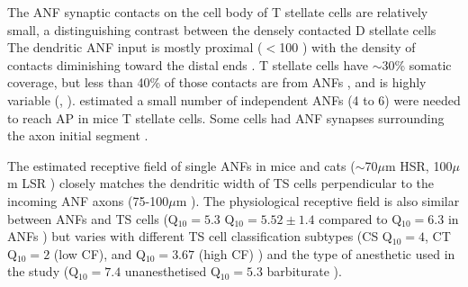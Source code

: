The ANF synaptic contacts on the cell body of T stellate cells are relatively small,
a distinguishing contrast between the densely contacted D stellate cells
\citep{Cant:1981,Cant:1982,RyugoWrightEtAl:1993,TolbertMorest:1982a,FayPopper:1994,ReddCahillEtAl:2002,RyugoWrigthEtAl:1993,Ryugo:1992,RyugoParks:2003}
The dendritic ANF input is mostly proximal ($<$100 \um) with the density of contacts
diminishing toward the distal ends \citep{SmithRhode:1989}.  T stellate cells have
$\sim$30\% somatic coverage, but less than 40\% of those contacts are from ANFs
\citep{Cant:1981,Cant:1982,RyugoWrightEtAl:1993,TolbertMorest:1982a,SmithRhode:1989},
and is highly variable (\citep*[36$\pm$10.5\% of somatic terminals in
cat][]{SmithRhode:1989}, \citep*[0--6 terminals per soma in
chinchilla][]{JosephsonMorest:1998}).  \citet{FerragamoGoldingEtAl:1998a} estimated a
small number of independent ANFs (4 to 6) were needed to reach AP in mice T stellate
cells.  Some cells had ANF synapses surrounding the axon initial segment
\citep{JosephsonMorest:1998}.


  




The estimated receptive field of single ANFs in mice and cats ($\sim$70$\mu$m HSR,
100$\mu$m LSR
\citep{OertelWuEtAl:1990,Ryugo:2008,MeltzerRyugo:2006,RyugoParks:2003,Ryugo:1992,BrownBerglundEtAl:1988,RoullierCronin-SchreiberEtAl:1986,FeketeRouillerEtAl:1984})
closely matches the dendritic width of TS cells perpendicular to the incoming ANF
axons (75-100$\mu$m \citep[Mouse]{OertelWuEtAl:1990}).
The physiological receptive field is also similar between ANFs and TS cells
(Q$_{10}=5.3$  \citep[cat][]{RhodeSmith:1986}Q$_{10}=5.52\pm1.4$  compared to
Q$_{10}=6.3$ in ANFs \citep[guinea pig]{JiangPalmerEtAl:1996}) but varies with different TS cell classification
subtypes (CS Q$_{10}=4$, CT Q$_{10}=2$ (low CF), and  Q$_{10}=3.67$ (high CF) \citep[guinea
pig]{PalmerWallaceEtAl:2003}) and the type of anesthetic used in the study (Q$_{10}=7.4$ unanesthetised Q$_{10}=5.3$ barbiturate \citep[cat][]{RhodeKettner:1987}).

